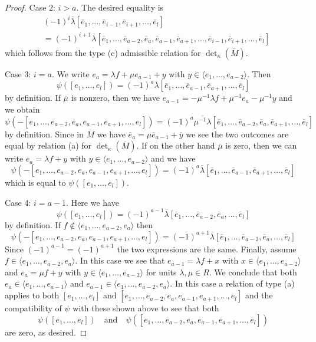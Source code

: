 \begin{proof}
\medskip\noindent
Case 2: $i > a$. The desired equality is
\begin{align*}
& (-1)^i
\overline{\lambda}
[\overline{e}_1,
\ldots,
\overline{e}_{i - 1},
\overline{e}_{i + 1},
\ldots,
\overline{e}_l] \\
& =
(-1)^{i + 1}
\overline{\lambda}
[\overline{e}_1,
\ldots,
\overline{e}_{a - 2},
\overline{e}_a,
\overline{e}_{a - 1},
\overline{e}_{a + 1},
\ldots,
\overline{e}_{i - 1},
\overline{e}_{i + 1},
\ldots,
\overline{e}_l]
\end{align*}
which follows from the type (c) admissible relation for
$\det_\kappa(\overline{M})$.

\medskip\noindent
Case 3: $i = a$. We write $e_a = \lambda f + \mu e_{a - 1} + y$
with $y \in \langle e_1, \ldots, e_{a - 2}\rangle$. Then
$$
\psi([e_1, \ldots, e_l]) =
(-1)^a
\overline{\lambda}
[\overline{e}_1,
\ldots,
\overline{e}_{a - 1},
\overline{e}_{a + 1},
\ldots,
\overline{e}_l]
$$
by definition. If $\overline{\mu}$ is nonzero, then we have
$e_{a - 1} = - \mu^{-1} \lambda f + \mu^{-1}e_a - \mu^{-1} y$
and we obtain
$$
\psi(-[e_1, \ldots, e_{a - 2}, e_a, e_{a - 1}, e_{a + 1}, \ldots, e_l]) =
(-1)^a
\overline{\mu^{-1}\lambda}
[\overline{e}_1,
\ldots,
\overline{e}_{a - 2},
\overline{e}_a,
\overline{e}_{a + 1},
\ldots,
\overline{e}_l]
$$
by definition. Since in $\overline{M}$ we have
$\overline{e}_a = \mu \overline{e}_{a - 1} + \overline{y}$ we see
the two outcomes are equal by relation (a) for $\det_\kappa(\overline{M})$.
If on the other hand $\overline{\mu}$ is zero, then we can write
$e_a = \lambda f + y$ with $y \in \langle e_1, \ldots, e_{a - 2}\rangle$
and we have
$$
\psi(-[e_1, \ldots, e_{a - 2}, e_a, e_{a - 1}, e_{a + 1}, \ldots, e_l]) =
(-1)^a
\overline{\lambda}
[\overline{e}_1,
\ldots,
\overline{e}_{a - 1},
\overline{e}_{a + 1},
\ldots,
\overline{e}_l]
$$
which is equal to $\psi([e_1, \ldots, e_l])$.

\medskip\noindent
Case 4: $i = a - 1$. Here we have
$$
\psi([e_1, \ldots, e_l]) =
(-1)^{a - 1}
\overline{\lambda}
[\overline{e}_1,
\ldots,
\overline{e}_{a - 2},
\overline{e}_a,
\ldots,
\overline{e}_l]
$$
by definition. If $f \not \in \langle e_1, \ldots, e_{a - 2}, e_a \rangle$
then
$$
\psi(-[e_1, \ldots, e_{a - 2}, e_a, e_{a - 1}, e_{a + 1}, \ldots, e_l]) =
(-1)^{a + 1}\overline{\lambda}
[\overline{e}_1,
\ldots,
\overline{e}_{a - 2},
\overline{e}_a,
\ldots,
\overline{e}_l]
$$
Since $(-1)^{a - 1} = (-1)^{a + 1}$ the two expressions are the same.
Finally, assume $f \in \langle e_1, \ldots, e_{a - 2}, e_a \rangle$.
In this case we see that $e_{a - 1} = \lambda f + x$ with
$x \in \langle e_1, \ldots, e_{a - 2}\rangle$ and
$e_a = \mu f + y$ with $y \in \langle e_1, \ldots, e_{a - 2}\rangle$
for units $\lambda, \mu \in R$.
We conclude that both
$e_a \in \langle e_1, \ldots, e_{a - 1} \rangle$ and
$e_{a - 1} \in \langle e_1, \ldots, e_{a - 2}, e_a\rangle$.
In this case a relation of type (a) applies to both
$[e_1, \ldots, e_l]$ and
$[e_1, \ldots, e_{a - 2}, e_a, e_{a - 1}, e_{a + 1}, \ldots, e_l]$
and the compatibility of $\psi$ with these shown above to see that both
$$
\psi([e_1, \ldots, e_l])
\quad\text{and}\quad
\psi([e_1, \ldots, e_{a - 2}, e_a, e_{a - 1}, e_{a + 1}, \ldots, e_l])
$$
are zero, as desired.


\end{proof}
